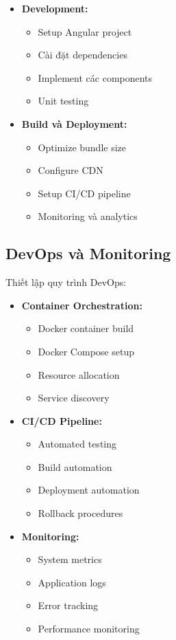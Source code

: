 \begin{itemize}
    \item \textbf{Development:}
    \begin{itemize}
        \item Setup Angular project
        \item Cài đặt dependencies
        \item Implement các components
        \item Unit testing
    \end{itemize}
    
    \item \textbf{Build và Deployment:}
    \begin{itemize}
        \item Optimize bundle size
        \item Configure CDN
        \item Setup CI/CD pipeline
        \item Monitoring và analytics
    \end{itemize}
\end{itemize}

\subsection{DevOps và Monitoring}
\hspace{0.5cm}Thiết lập quy trình DevOps:

\begin{itemize}
    \item \textbf{Container Orchestration:}
    \begin{itemize}
        \item Docker container build
        \item Docker Compose setup
        \item Resource allocation
        \item Service discovery
    \end{itemize}
    
    \item \textbf{CI/CD Pipeline:}
    \begin{itemize}
        \item Automated testing
        \item Build automation
        \item Deployment automation
        \item Rollback procedures
    \end{itemize}
    
    \item \textbf{Monitoring:}
    \begin{itemize}
        \item System metrics
        \item Application logs
        \item Error tracking
        \item Performance monitoring
    \end{itemize}
\end{itemize}


